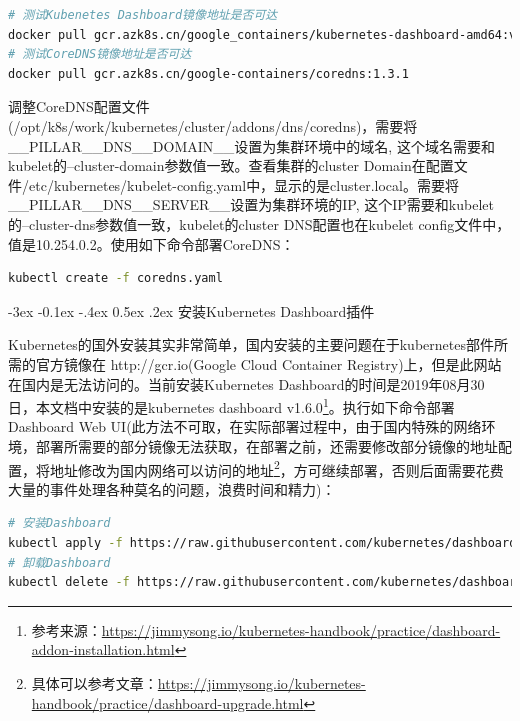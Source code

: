 \documentclass[8pt]{book}
\makeatletter
\numberwithin{dummy}{section}
\theoremstyle{ocrenumbox}
\theoremstyle{blacknumex}
\theoremstyle{blacknumbox}
\theoremstyle{ocrenum}
\renewcommand{\subsection}{\@startsection {subsection}{2}{\z@}
	{-3ex \@plus -0.1ex \@minus -.4ex}
	{0.5ex \@plus.2ex }
	{\normalfont\sffamily\bfseries}}
\makeatother
\begin{document}
\begin{lstlisting}[language=Bash]
# 测试Kubenetes Dashboard镜像地址是否可达
docker pull gcr.azk8s.cn/google_containers/kubernetes-dashboard-amd64:v1.10.1
# 测试CoreDNS镜像地址是否可达
docker pull gcr.azk8s.cn/google-containers/coredns:1.3.1
\end{lstlisting}

调整CoreDNS配置文件(/opt/k8s/work/kubernetes/cluster/addons/dns/coredns)，需要将\_\_PILLAR\_\_DNS\_\_DOMAIN\_\_设置为集群环境中的域名, 这个域名需要和kubelet的--cluster-domain参数值一致。查看集群的cluster Domain在配置文件/etc/kubernetes/kubelet-config.yaml中，显示的是cluster.local。需要将\_\_PILLAR\_\_DNS\_\_SERVER\_\_设置为集群环境的IP, 这个IP需要和kubelet的--cluster-dns参数值一致，kubelet的cluster DNS配置也在kubelet config文件中，值是10.254.0.2。使用如下命令部署CoreDNS：

\begin{lstlisting}[language=Bash]
kubectl create -f coredns.yaml
\end{lstlisting}

\subsection{安装Kubernetes Dashboard插件}

Kubernetes的国外安装其实非常简单，国内安装的主要问题在于kubernetes部件所需的官方镜像在 http://gcr.io(Google Cloud Container Registry)上，但是此网站在国内是无法访问的。当前安装Kubernetes Dashboard的时间是2019年08月30日，本文档中安装的是kubernetes dashboard v1.6.0\footnote{参考来源：\url{https://jimmysong.io/kubernetes-handbook/practice/dashboard-addon-installation.html}}。执行如下命令部署Dashboard Web UI(此方法不可取，在实际部署过程中，由于国内特殊的网络环境，部署所需要的部分镜像无法获取，在部署之前，还需要修改部分镜像的地址配置，将地址修改为国内网络可以访问的地址\footnote{具体可以参考文章：\url{https://jimmysong.io/kubernetes-handbook/practice/dashboard-upgrade.html}}，方可继续部署，否则后面需要花费大量的事件处理各种莫名的问题，浪费时间和精力)：

\begin{lstlisting}[language=Bash]
# 安装Dashboard
kubectl apply -f https://raw.githubusercontent.com/kubernetes/dashboard/v1.10.1/src/deploy/recommended/kubernetes-dashboard.yaml
# 卸载Dashboard
kubectl delete -f https://raw.githubusercontent.com/kubernetes/dashboard/v1.10.1/src/deploy/recommended/kubernetes-dashboard.yaml
\end{lstlisting}
\end{document}
